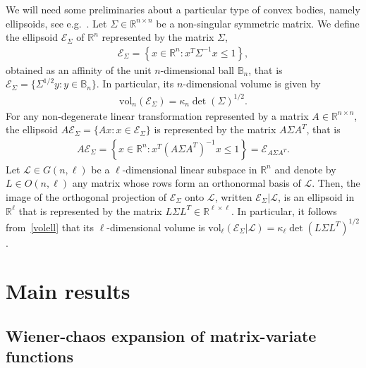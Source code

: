 \documentclass[AHL,Unicode,longabstracts,published]{cedram}
\newcommand{\scL}{\mathscr{L}}
\newcommand{\rvol}{\mathrm{vol}}
\newcommand{\clE}{\mathcal{E}}
\newcommand{\R}{\mathbb{R}}
\newcommand{\bbB}{\mathbb{B}}
\begin{document}
We will need some preliminaries about a particular type of convex bodies, namely ellipsoids, see e.g.~\cite{Kab14}. Let $\Sigma \in \R^{n\times n}$ be a non-singular symmetric matrix. We define the ellipsoid $\clE_{\Sigma}$ of $\R^n$ represented by the matrix $\Sigma$,
\begin{gather*}
\clE_{\Sigma}= \left\{x \in \R^n: x^T \Sigma^{-1}x \leq 1\right\},
\end{gather*}
obtained as an affinity of the unit $n$-dimensional ball $\bbB_n$, that is $\clE_{\Sigma}=\{ \Sigma^{1/2}y : y \in \bbB_n \} $. In particular, its $n$-dimensional volume is given by
\begin{gather}\label{volell}
\rvol_n(\clE_{\Sigma})= \kappa_n \det(\Sigma)^{1/2}.
\end{gather}
For any non-degenerate linear transformation represented by a matrix $A \in \R^{n \times n}$, the ellipsoid $A\clE_{\Sigma}= \{ Ax : x \in \clE_{\Sigma}\}$ is represented by the matrix $A\Sigma A^T$, that is
\begin{gather*}
A\clE_{\Sigma}= \left\{ x\in \R^n : x^T (A\Sigma A^T)^{-1} x \leq 1 \right\} = \clE_{A\Sigma A^T}.
\end{gather*}
Let $\scL \in G(n,\ell)$ be a $\ell$-dimensional linear subspace in $\R^n$ and denote by $L \in O(n,\ell)$ any matrix whose rows form an orthonormal basis of $\scL$. Then, the image of the orthogonal projection of $\clE_{\Sigma}$ onto $\scL$, written $\clE_{\Sigma}|\scL$, is an ellipsoid in $\R^{\ell}$ that is represented by the matrix $L\Sigma L^T \in \R^{\ell\times \ell}$. In particular, it follows from~\eqref{volell} that its $\ell$-dimensional volume is $\rvol_{\ell}(\clE_{\Sigma}|\scL)=
\kappa_{\ell}\det(L\Sigma L^T)^{1/2}$.


\section{Main results}\label{SecMainResults}

\subsection{Wiener-chaos expansion of matrix-variate functions}\label{SecWC}
\end{document}
